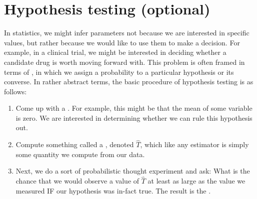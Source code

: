 %
%
%
%
%
%
%



\section{Hypothesis testing (optional)}
In statistics, we might infer parameters not because we are interested in specific values, but rather because we would like to use them to make a decision. For example, in a clinical trial, we might be interested in deciding whether a candidate drug is worth moving forward with. This problem is often framed in terms of , in which we assign a probability to a particular hypothesis or its converse. 
In rather abstract terms, the basic procedure of hypothesis testing is as follows:
\begin{enumerate}
\item Come up with a . For example, this might be that the mean of some variable is zero. We are interested in determining whether we can rule this hypothesis out. 
\item Compute something called a , denoted $\hat{T}$, which like any estimator is simply some quantity we compute from our data. 
\item Next, we do a sort of probabilistic thought experiment and ask: What is the chance that we would observe a value of $\hat{T}$ at least as large as the value we measured  IF our hypothesis was in-fact true.  The result is the . 
\end{enumerate}

